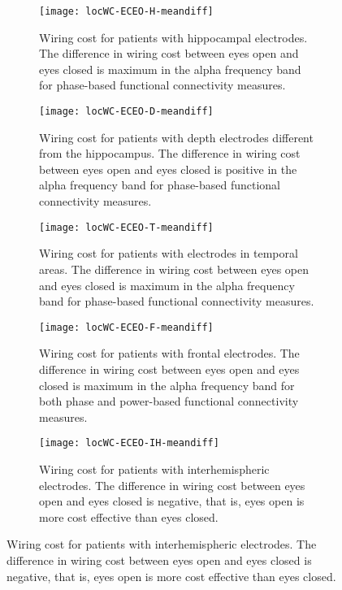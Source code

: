 \documentclass[11pt, onecolumn]{article}
\begin{document}
\begin{figure}[p]
\begin{adjustbox}{minipage=\linewidth,scale=0.9}
  \begin{subfigure}[t]{0.5\linewidth}
    \centering
    \texttt{[image: locWC-ECEO-H-meandiff]} 
    \caption{Wiring cost for patients with hippocampal electrodes. The difference in wiring cost between eyes open and eyes closed is maximum in the alpha frequency band for phase-based functional connectivity measures.} 
    \label{figi-2:a} 
  \end{subfigure}%
  \hspace{1ex}
  \begin{subfigure}[t]{0.5\linewidth}
    \centering
    \texttt{[image: locWC-ECEO-D-meandiff]} 
    \caption{Wiring cost for patients with depth electrodes different from the hippocampus. The difference in wiring cost between eyes open and eyes closed is positive in the alpha frequency band for phase-based functional connectivity measures.} 
    \label{figi-2:b} 
  \end{subfigure} 
  \begin{subfigure}[t]{0.5\linewidth}
    \centering
    \texttt{[image: locWC-ECEO-T-meandiff]} 
    \caption{Wiring cost for patients with electrodes in temporal areas. The difference in wiring cost between eyes open and eyes closed is maximum in the alpha frequency band for phase-based functional connectivity measures.} 
    \label{figi-2:c} 
  \end{subfigure} 
  \hspace{1ex}
 \begin{subfigure}[t]{0.5\linewidth}
    \centering
    \texttt{[image: locWC-ECEO-F-meandiff]} 
    \caption{Wiring cost for patients with frontal electrodes. The difference in wiring cost between eyes open and eyes closed is maximum in the alpha frequency band for both phase and power-based functional connectivity measures.} 
    \label{figi-2:d} 
  \end{subfigure} 
    \begin{subfigure}[t]{ 0.5\linewidth}
    \centering
    \texttt{[image: locWC-ECEO-IH-meandiff]} 
    \caption{Wiring cost for patients with interhemispheric electrodes. The difference in wiring cost between eyes open and eyes closed is negative, that is, eyes open is more cost effective than eyes closed.} 
    \label{figi-2:e} 
  \end{subfigure}%
    \hspace{1ex}

\end{adjustbox}
\end{figure}
\end{document}

